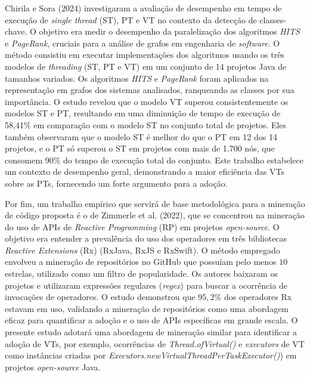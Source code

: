 Chirila e Sora (2024)\nocite{chirila:24} investigaram a avaliação de desempenho em tempo de execução de \textit{single thread} (ST), PT e VT no contexto da detecção de classes-chave. O objetivo era medir o desempenho da paralelização dos algoritmos \textit{HITS} e \textit{PageRank}, cruciais para a análise de grafos em engenharia de \textit{software}. O método consistiu em executar implementações dos algoritmos usando os três modelos de \textit{threading} (ST, PT e VT) em um conjunto de 14 projetos Java de tamanhos variados. Os algoritmos \textit{HITS} e \textit{PageRank} foram aplicados na representação em grafos dos sistemas analisados, ranqueando as classes por sua importância. O estudo revelou que o modelo VT superou consistentemente os modelos ST e PT, resultando em uma diminuição de tempo de execução de 58,41\% em comparação com o modelo ST no conjunto total de projetos. Eles também observaram que o modelo ST é melhor do que o PT em 12 dos 14 projetos, e o PT só superou o ST em projetos com mais de 1.700 nós, que consomem 90\% do tempo de execução total do conjunto. Este trabalho estabelece um contexto de desempenho geral, demonstrando a maior eficiência das VTs sobre as PTs, fornecendo um forte argumento para a adoção.

Por fim, um trabalho empírico que servirá de base metodológica para a mineração de código proposta é o de Zimmerle et al. (2022)\nocite{zimmerle:22}, que se concentrou na mineração do uso de APIs de \textit{Reactive Programming} (RP) em projetos \textit{open-source}. O objetivo era entender a prevalência do uso dos operadores em três bibliotecas \textit{Reactive Extensions} (Rx) (RxJava, RxJS e RxSwift). O método empregado envolveu a mineração de repositórios no GitHub que possuíam pelo menos $10$ estrelas, utilizado como um filtro de popularidade. Os autores baixaram os projetos e utilizaram expressões regulares (\textit{regex}) para buscar a ocorrência de invocações de operadores. O estudo demonstrou que $95,2\%$ dos operadores Rx estavam em uso, validando a mineração de repositórios como uma abordagem eficaz para quantificar a adoção e o uso de APIs específicas em grande escala. O presente estudo adotará uma abordagem de mineração similar para identificar a adoção de VTs, por exemplo, ocorrências de \textit{Thread.ofVirtual()} e \textit{executors} de VT como instâncias criadas por \textit{Executors.newVirtualThreadPerTaskExecutor()}) em projetos \textit{open-source} Java.